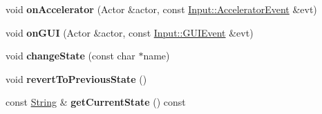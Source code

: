 \begin{DoxyCompactItemize}
\item 
void {\bfseries on\+Accelerator} (Actor \&actor, const \hyperlink{class_i_dream_sky_1_1_input_1_1_accelerator_event}{Input\+::\+Accelerator\+Event} \&evt)\hypertarget{class_i_dream_sky_1_1_state_machine_a6435a0b74118f262cbd0eab4536665dc}{}\label{class_i_dream_sky_1_1_state_machine_a6435a0b74118f262cbd0eab4536665dc}

\item 
void {\bfseries on\+G\+UI} (Actor \&actor, const \hyperlink{class_i_dream_sky_1_1_input_1_1_g_u_i_event}{Input\+::\+G\+U\+I\+Event} \&evt)\hypertarget{class_i_dream_sky_1_1_state_machine_ae49bbbcaf5cb2fcc9068781213594136}{}\label{class_i_dream_sky_1_1_state_machine_ae49bbbcaf5cb2fcc9068781213594136}

\item 
void {\bfseries change\+State} (const char $\ast$name)\hypertarget{class_i_dream_sky_1_1_state_machine_a3a3a8567592fecf7707182d43102dee4}{}\label{class_i_dream_sky_1_1_state_machine_a3a3a8567592fecf7707182d43102dee4}

\item 
void {\bfseries revert\+To\+Previous\+State} ()\hypertarget{class_i_dream_sky_1_1_state_machine_acb37ac35b4ed5a73e2c9f8f44c8e78e4}{}\label{class_i_dream_sky_1_1_state_machine_acb37ac35b4ed5a73e2c9f8f44c8e78e4}

\item 
const \hyperlink{class_i_dream_sky_1_1_string}{String} \& {\bfseries get\+Current\+State} () const \hypertarget{class_i_dream_sky_1_1_state_machine_ab6025b1e38b03b6e12b02e6d2888f340}{}\label{class_i_dream_sky_1_1_state_machine_ab6025b1e38b03b6e12b02e6d2888f340}

\end{DoxyCompactItemize}
